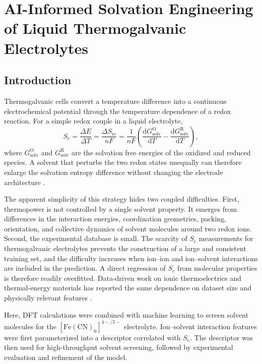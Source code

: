 \chapter{AI-Informed Solvation Engineering of Liquid Thermogalvanic
Electrolytes}

\section{Introduction}

Thermogalvanic cells convert a temperature difference into a continuous
electrochemical potential through the temperature dependence of a redox
reaction. For a simple redox couple in a liquid electrolyte,
\begin{equation}
S_e=\frac{\Delta E}{\Delta T}
=\frac{\Delta S_{\mathrm{rc}}}{nF}
=\frac{1}{nF}
\left(
\frac{\mathrm{d}G_{\mathrm{solv}}^{\mathrm{O}}}{\mathrm{d}T}
-
\frac{\mathrm{d}G_{\mathrm{solv}}^{\mathrm{R}}}{\mathrm{d}T}
\right),
\end{equation}
where $G_{\mathrm{solv}}^{\mathrm{O}}$ and
$G_{\mathrm{solv}}^{\mathrm{R}}$ are the solvation free energies of the
oxidized and reduced species. A solvent that perturbs the two redox states
unequally can therefore enlarge the solvation entropy difference without
changing the electrode architecture \citep{chen2023solvation}.

The apparent simplicity of this strategy hides two coupled difficulties.
First, thermopower is not controlled by a single solvent property. It emerges
from differences in the interaction energies, coordination geometries, packing,
orientation, and collective dynamics of solvent molecules around two redox
ions. Second, the experimental database is small. The scarcity of $S_e$
measurements for thermogalvanic electrolytes prevents the construction of a
large and consistent training set, and the difficulty increases when
ion--ion and ion--solvent interactions are included in the prediction. A
direct regression of $S_e$ from molecular properties is therefore readily
overfitted. Data-driven work on ionic thermoelectrics and thermal-energy
materials has reported the same dependence on dataset size and physically
relevant features \citep{wu2024unlocking,li2022mlthermal}.

Here, DFT calculations were combined with machine learning to screen solvent
molecules for the $[\mathrm{Fe(CN)}_6]^{4-/3-}$ electrolyte. Ion--solvent
interaction features were first parameterized into a descriptor correlated
with $S_e$. The descriptor was then used for high-throughput solvent screening,
followed by experimental evaluation and refinement of the model.

